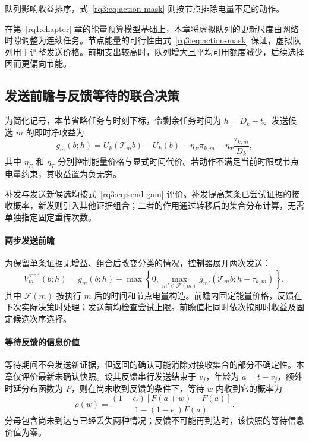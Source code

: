 队列影响收益排序，式~\eqref{rq3:eq:action-mask} 则按节点排除电量不足的动作。

在第~\ref{rq1:chapter} 章的能量预算模型基础上，本章将虚拟队列的更新尺度由网络时隙调整为连续任务。节点能量的可行性由式~\eqref{rq3:eq:action-mask} 保证，虚拟队列用于调整发送价格。前期支出较高时，队列增大且平均可用额度减少，后续选择因而更偏向节能。

\subsection{发送前瞻与反馈等待的联合决策}
\label{rq3:subsec:decision}

为简化记号，本节省略任务与时刻下标，令剩余任务时间为 $h=D_k-t$。发送候选 $m$ 的即时净收益为
\begin{equation}
  g_m(b;h)=U_k(\mathcal T_m b)-U_k(b)
     -\eta_E\pi_{k,m}-\eta_T\frac{\tau_{k,m}}{D_k},
  \label{rq3:eq:send-gain}
\end{equation}
其中 $\eta_E$ 和 $\eta_T$ 分别控制能量价格与显式时间代价。若动作不满足当前时限或节点电量约束，其收益置为负无穷。

补发与发送新候选均按式~\eqref{rq3:eq:send-gain} 评价。补发提高某条已尝试证据的接收概率，新发则引入其他证据组合；二者的作用通过转移后的集合分布计算，无需单独指定固定重传次数。

\paragraph{两步发送前瞻}
为保留单条证据无增益、组合后改变分类的情况，控制器展开两次发送：
\begin{equation}
  V_m^{\mathrm{send}}(b;h)=g_m(b;h)
    +\max\left\{0,\max_{m'\in\mathcal F(m)}
      g_{m'}(\mathcal T_m b;h-\tau_{k,m})\right\},
  \label{rq3:eq:two-step-lookahead}
\end{equation}
其中 $\mathcal F(m)$ 按执行 $m$ 后的时间和节点电量构造。前瞻内固定能量价格，反馈在下次实际决策时处理；发送前均检查尝试上限。前瞻值相同时依次按即时收益及固定候选次序选择。

\paragraph{等待反馈的信息价值}
等待期间不会发送新证据，但返回的确认可能消除对接收集合的部分不确定性。本章仅评价最新未确认快照。设其反馈串行发送结束于 $v_j$，年龄为 $a=t-v_j$，额外时延分布函数为 $F$，则在尚未收到反馈的条件下，等待 $w$ 内收到它的概率为
\begin{equation}
  \rho(w)=\frac{(1-\epsilon_{\mathrm f})[F(a+w)-F(a)]}
                {1-(1-\epsilon_{\mathrm f})F(a)}.
  \label{rq3:eq:conditional-feedback}
\end{equation}
分母包含尚未到达与已经丢失两种情况；反馈不可能再到达时，该快照的等待信息价值为零。

